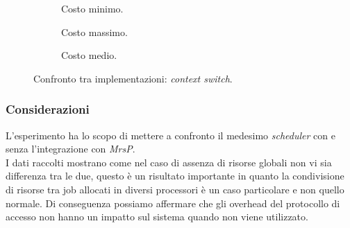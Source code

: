   \begin{figure}[htb]
    \centering
      \begin{subfigure}[b]{0.49\textwidth}
        \centering
        \resizebox{\linewidth}{!}\graficoCxsMIN  
        \caption{Costo minimo.}
        \label{fig:cxsMin}
      \end{subfigure}
      \begin{subfigure}[b]{0.49\textwidth}
        \centering
        \resizebox{\linewidth}{!}\graficoCxsMAX
        \caption{Costo massimo.}
        \label{fig:cxsMax}
      \end{subfigure}
      \begin{subfigure}[b]{0.49\textwidth}
        \centering
        \resizebox{\linewidth}{!}\graficoCxsAVG
        \caption{Costo medio.}
        \label{fig:cxsAvg}
      \end{subfigure}

    \caption{Confronto tra implementazioni: \textit{context switch}.}
    \label{fig:cxs}
  \end{figure}

\subsubsection{Considerazioni}
\label{sec:confronto_norisorsa_cons}

\noindent L'esperimento ha lo scopo di mettere a confronto il medesimo \textit{scheduler} con e senza l'integrazione con \textit{MrsP}.\\

\noindent I dati raccolti mostrano come nel caso di assenza di risorse globali non vi sia differenza tra le due, questo è un risultato importante in quanto la condivisione di risorse tra job allocati in diversi processori è un caso particolare e non quello normale. Di conseguenza possiamo affermare che gli overhead del protocollo di accesso non hanno un impatto sul sistema quando non viene utilizzato.\\